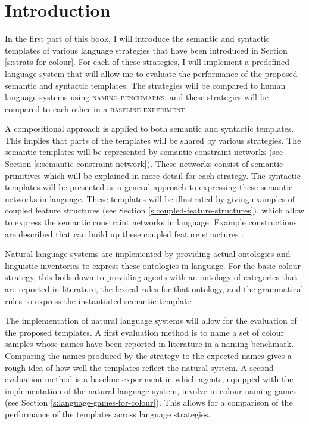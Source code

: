 \section*{Introduction}

In the first part of this book, I will introduce the semantic and
syntactic templates of various language strategies that have been
introduced in Section \ref{s:strats-for-colour}. For each of these
strategies, I will implement a predefined language system that will
allow me to evaluate the performance of the proposed semantic and
syntactic templates. The strategies will be compared to human language
systems using \textsc{naming benchmarks}, and these strategies will be
compared to each other in a \textsc{baseline experiment}.

A compositional approach is applied to both
semantic and syntactic
  templates. This implies that parts of the
templates will be shared by various strategies. The semantic templates
will be represented by semantic constraint networks (see Section
\ref{s:semantic-constraint-network}). These networks consist of
semantic primitives which will be explained in more detail for each
strategy. The syntactic templates will be presented as a general
approach to expressing these semantic networks in language. These
templates will be illustrated by giving examples of coupled feature
structures (see Section \ref{s:coupled-feature-structures}), which
allow to express the semantic constraint networks in language. Example
constructions are described that can build up these coupled feature
structures \citep{bleys06next, steels07emergence, bleys08expressing}.

Natural language systems are implemented by providing actual
ontologies and linguistic inventories to express these ontologies in
language. For the basic colour strategy, this boils down to providing
agents with an ontology of categories that are reported in literature,
the lexical rules for that ontology, and the grammatical rules to
express the instantiated semantic template.

The implementation of natural language systems will allow for the
evaluation of the proposed templates. A first evaluation method is to
name a set of colour samples whose names have been reported in
literature in a naming benchmark. 
Comparing the names produced by the strategy to the
expected names gives a rough idea of how well the templates reflect
the natural system. A second evaluation method is a baseline
  experiment in which agents, equipped
with the implementation of the natural language system, involve in
colour naming games (see Section
\ref{s:language-games-for-colour}). This allows for a comparison of
the performance of the templates across language strategies.

\newpage
\thispagestyle{empty}
